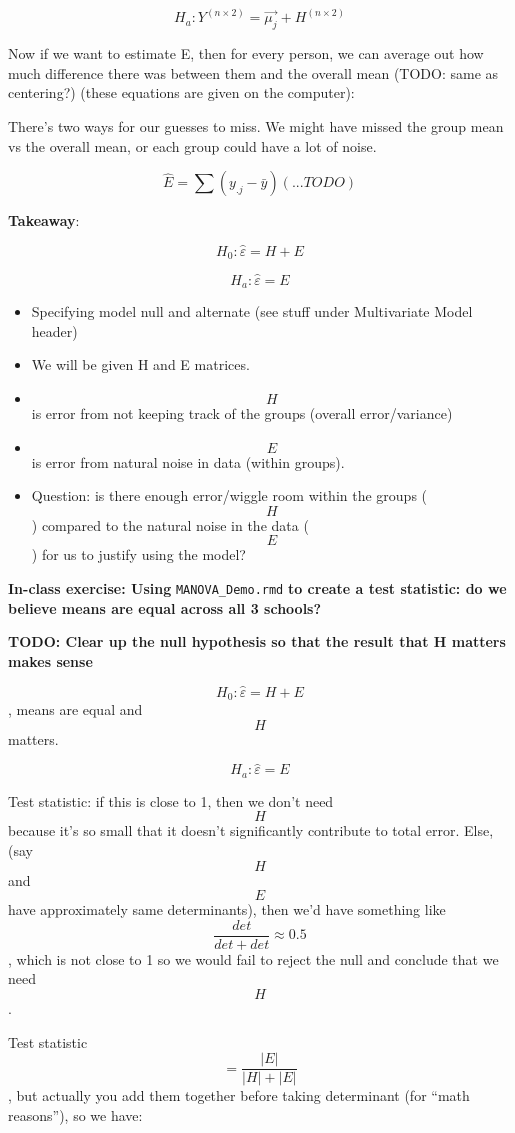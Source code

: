\[ H_a: Y^{(n \times 2)} = \vec{\mu_j} + H^{(n \times 2)} \]

Now if we want to estimate E, then for every person, we can average out
how much difference there was between them and the overall mean (TODO:
same as centering?) (these equations are given on the computer):

There's two ways for our guesses to miss. We might have missed the group
mean vs the overall mean, or each group could have a lot of noise.

\[ \hat{E} = \sum (y_{.j} - \bar{y})( ... TODO)\]

\textbf{Takeaway}:

\[H_0: \hat{\varepsilon} = H + E\]

\[H_a: \hat{\varepsilon} = E \]

\begin{itemize}
\item
  Specifying model null and alternate (see stuff under Multivariate
  Model header)
\item
  We will be given H and E matrices.
\item
  \[H\] is error from not keeping track of the groups (overall
  error/variance)
\item
  \[E\] is error from natural noise in data (within groups).
\item
  Question: is there enough error/wiggle room within the groups (\[H\])
  compared to the natural noise in the data (\[E\]) for us to justify
  using the model?
\end{itemize}

\textbf{In-class exercise: Using} \texttt{MANOVA\_Demo.rmd} \textbf{to
create a test statistic: do we believe means are equal across all 3
schools?}

\textbf{TODO: Clear up the null hypothesis so that the result that H
matters makes sense}

\[H_0: \hat{\varepsilon} = H + E\], means are equal and \[H\] matters.

\[H_a: \hat{\varepsilon} = E \]

Test statistic: if this is close to 1, then we don't need \[H\] because
it's so small that it doesn't significantly contribute to total error.
Else, (say \[H\] and \[E\] have approximately same determinants), then
we'd have something like \[\frac{det}{det + det} \approx 0.5\], which is
not close to 1 so we would fail to reject the null and conclude that we
need \[H\].

Test statistic \[ = \frac{|E|}{|H| + |E|} \], but actually you add them
together before taking determinant (for ``math reasons''), so we have:


